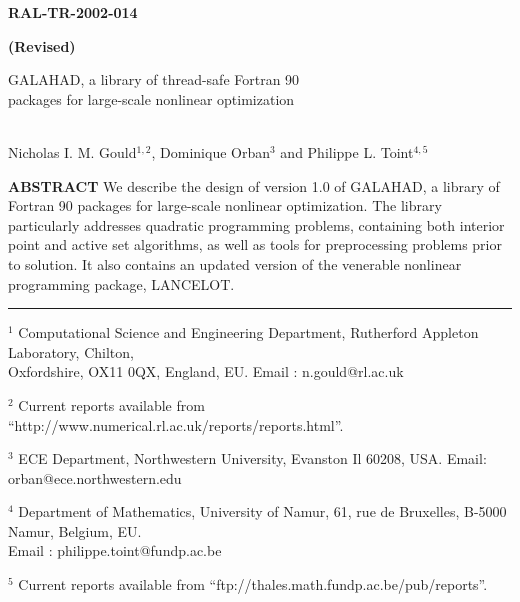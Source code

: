 \documentclass[twoside]{article}
\title{\papertitle}
\author{\paperauthor}
\newcommand{\gal}{{\sf GALAHAD}}
\newcommand{\lan}{{\sf LANCELOT}}
\newcommand{\theabstract}{We describe the
design of version 1.0 of \gal, a library of Fortran 90 packages for 
large-scale nonlinear optimization.
The library particularly addresses quadratic programming problems,
containing both interior point and active set algorithms, as well as
tools for preprocessing problems prior to solution.
It also contains an updated version of the venerable nonlinear
programming package, \lan.}
\begin{document}
%


\begin{titlepage}

\begin{flushright} {\large \bf RAL-TR-2002-014} \end{flushright}           
\vspace*{-0.6 cm}
\begin{flushright} {\large \bf (Revised)} \end{flushright}           
\vspace*{0.2 cm}

{\LARGE \bf
\begin{center}
\gal, a library of thread-safe Fortran 90 \\
packages for large-scale nonlinear optimization
\end{center}}
\vspace*{0.1 cm}
\begin{center}
\mbox{} \\
      Nicholas I. M. Gould$^{1,2}$,
      Dominique Orban$^{3}$
      and
      Philippe L. Toint$^{4,5}$
\\
\end{center}

\vspace{0.4cm}

\begin{center}
\parbox{\textwidth}{
{
{\bf  ABSTRACT \newline}
\theabstract}
}
\end{center}

\vspace{0.2 cm}

\noindent \rule{\textwidth}{0.001in}
\vspace{0.1 cm}

{\small
\begin{description}
\item  $^1$ Computational Science and Engineering Department,
       Rutherford Appleton Laboratory, 
       Chilton, \\ Oxfordshire, OX11 0QX, England, EU. 
       Email : n.gould@rl.ac.uk
\item  $^2$ Current reports available from %
       ``http://www.numerical.rl.ac.uk/reports/reports.html''.
\item $^3$ ECE Department,  Northwestern University, Evanston Il 60208, USA. 
       Email: orban@ece.northwestern.edu
\item  $^4$ Department of Mathematics, University of Namur, 
       61, rue de Bruxelles, B-5000 Namur, Belgium, EU. \\
       Email : philippe.toint@fundp.ac.be
\item  $^5$ Current reports available from %
       ``ftp://thales.math.fundp.ac.be/pub/reports''.
\end{description}
}


\end{titlepage}
\end{document}
